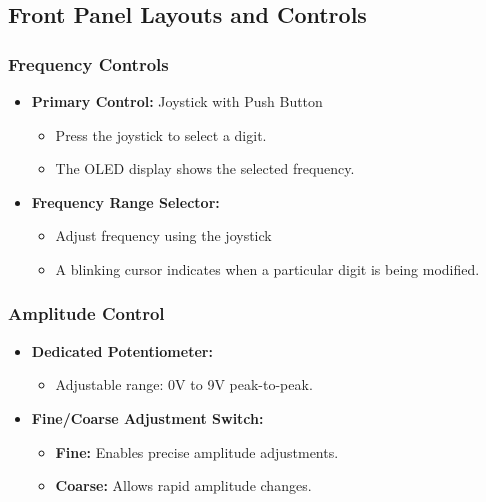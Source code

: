 \documentclass[12pt,a4paper]{article}
\begin{document}
\subsection{Front Panel Layouts and Controls}
\subsubsection{Frequency Controls}
\begin{itemize}
    \item \textbf{Primary Control:} Joystick with Push Button \begin{itemize}
        \item Press the joystick to select a digit.
        \item The OLED display shows the selected frequency.
    \end{itemize}
    \item \textbf{Frequency Range Selector:}
    \begin{itemize}
        \item Adjust frequency using the joystick
        \item A blinking cursor indicates when a particular digit is being modified.
    \end{itemize}
\end{itemize}


\subsubsection{Amplitude Control}
\begin{itemize}
    \item \textbf{Dedicated Potentiometer:}
    \begin{itemize}
        \item Adjustable range: 0V to 9V peak-to-peak.
    \end{itemize}
    \item \textbf{Fine/Coarse Adjustment Switch:}
    \begin{itemize}
        \item \textbf{Fine:} Enables precise amplitude adjustments.
        \item \textbf{Coarse:} Allows rapid amplitude changes.
    \end{itemize}
\end{itemize}
\end{document}
